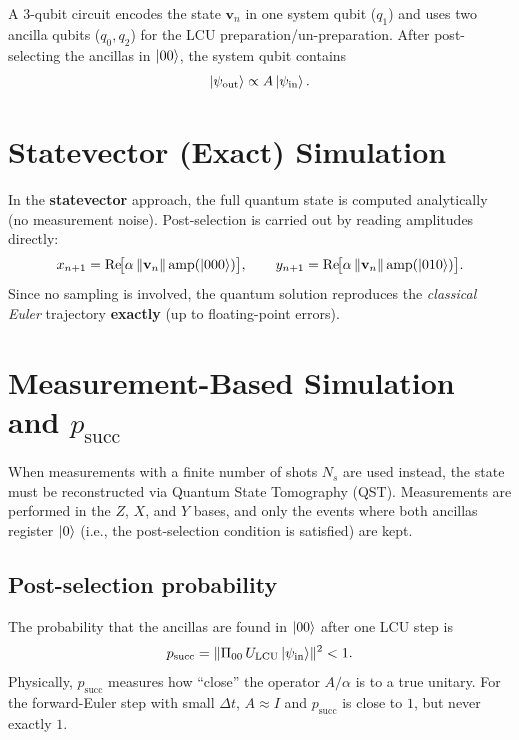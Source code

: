 \documentclass[11pt,a4paper]{article}
\begin{document}
A 3-qubit circuit encodes the state \(\mathbf v_n\) in one system qubit
(\(q_1\)) and uses two ancilla qubits (\(q_0,q_2\)) for the LCU
preparation/un-preparation.  After post-selecting the ancillas in
\(\ket{00}\), the system qubit contains
\begin{equation}
  \ket{\psi_{\text{out}}}
  \propto A\ket{\psi_{\text{in}}}.
\end{equation}

\section{Statevector (Exact) Simulation}

In the \textbf{statevector} approach, the full quantum state is computed
analytically (no measurement noise).  Post-selection is carried out by
reading amplitudes directly:
\begin{equation}
  x_{n+1} = \Re\!\bigl[\alpha\,\lVert\mathbf v_n\rVert\,
             \text{amp}(\ket{000})\bigr],\qquad
  y_{n+1} = \Re\!\bigl[\alpha\,\lVert\mathbf v_n\rVert\,
             \text{amp}(\ket{010})\bigr].
\end{equation}
Since no sampling is involved, the quantum solution reproduces the
\emph{classical Euler} trajectory \textbf{exactly} (up to floating-point
errors).

\section{Measurement-Based Simulation and \texorpdfstring{$p_{\text{succ}}$}{p\_succ}}

When measurements with a finite number of shots \(N_s\) are used instead,
the state must be reconstructed via Quantum State Tomography (QST).
Measurements are performed in the \(Z\), \(X\), and \(Y\) bases, and
only the events where both ancillas register \(\ket{0}\) (i.e., the
post-selection condition is satisfied) are kept.

\subsection{Post-selection probability}

The probability that the ancillas are found in \(\ket{00}\) after one
LCU step is
\begin{equation}\label{eq:psucc}
  p_{\text{succ}}
  = \lVert \Pi_{00}\,U_{\text{LCU}}\ket{\psi_{\text{in}}} \rVert^2
  < 1.
\end{equation}
Physically, \(p_{\text{succ}}\) measures how ``close'' the operator
\(A/\alpha\) is to a true unitary.  For the forward-Euler step with
small \(\Delta t\), \(A\approx I\) and \(p_{\text{succ}}\) is close to
\(1\), but never exactly \(1\).
\end{document}
